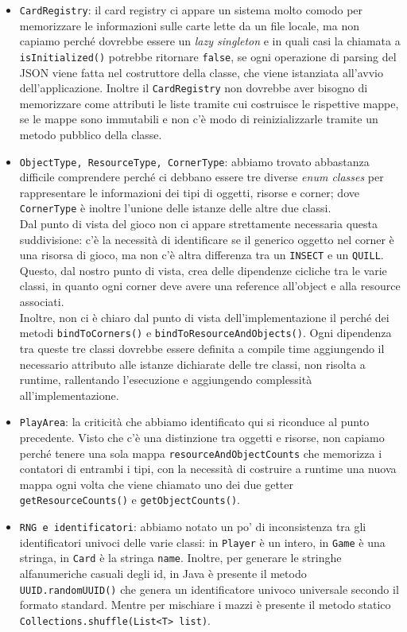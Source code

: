 \documentclass[12pt]{article}
\begin{document}
\begin{itemize}
    \item \texttt{CardRegistry}: il card registry ci appare un sistema molto comodo per memorizzare le informazioni sulle carte lette da un file locale, ma non capiamo perché dovrebbe essere un \textit{lazy singleton} e in quali casi la chiamata a \texttt{isInitialized()} potrebbe ritornare \texttt{false}, se ogni operazione di parsing del JSON viene fatta nel costruttore della classe, che viene istanziata all'avvio dell'applicazione. Inoltre il \texttt{CardRegistry} non dovrebbe aver bisogno di memorizzare come attributi le liste tramite cui costruisce le rispettive mappe, se le mappe sono immutabili e non c'è modo di reinizializzarle tramite un metodo pubblico della classe.
    \item \texttt{ObjectType, ResourceType, CornerType}: abbiamo trovato abbastanza difficile comprendere perché ci debbano essere tre diverse \textit{enum classes} per rappresentare le informazioni dei tipi di oggetti, risorse e corner; dove \texttt{CornerType} è inoltre l'unione delle istanze delle altre due classi.\\
    Dal punto di vista del gioco non ci appare strettamente necessaria questa suddivisione: c'è la necessità di identificare se il generico oggetto nel corner è una risorsa di gioco, ma non c'è altra differenza tra un \texttt{INSECT} e un \texttt{QUILL}.\\
    Questo, dal nostro punto di vista, crea delle dipendenze cicliche tra le varie classi, in quanto ogni corner deve avere una reference all'object e alla resource associati.\\
    Inoltre, non ci è chiaro dal punto di vista dell'implementazione il perché dei metodi \texttt{bindToCorners()} e \texttt{bindToResourceAndObjects()}. Ogni dipendenza tra queste tre classi dovrebbe essere definita a compile time aggiungendo il necessario attributo alle istanze dichiarate delle tre classi, non risolta a runtime, rallentando l'esecuzione e aggiungendo complessità all'implementazione.
    \item \texttt{PlayArea}: la criticità che abbiamo identificato qui si riconduce al punto precedente. Visto che c'è una distinzione tra oggetti e risorse, non capiamo perché tenere una sola mappa \texttt{resourceAndObjectCounts} che memorizza i contatori di entrambi i tipi, con la necessità di costruire a runtime una nuova mappa ogni volta che viene chiamato uno dei due getter \texttt{getResourceCounts()} e \texttt{getObjectCounts()}.
    \item \texttt{RNG e identificatori}: abbiamo notato un po' di inconsistenza tra gli identificatori univoci delle varie classi: in \texttt{Player} è un intero, in \texttt{Game} è una stringa, in \texttt{Card} è la stringa \texttt{name}. Inoltre, per generare le stringhe alfanumeriche casuali degli id, in Java è presente il metodo \texttt{UUID.randomUUID()} che genera un identificatore univoco universale secondo il formato standard. Mentre per mischiare i mazzi è presente il metodo statico \texttt{Collections.shuffle(List<T> list)}.
\end{itemize}
%
\end{document}
